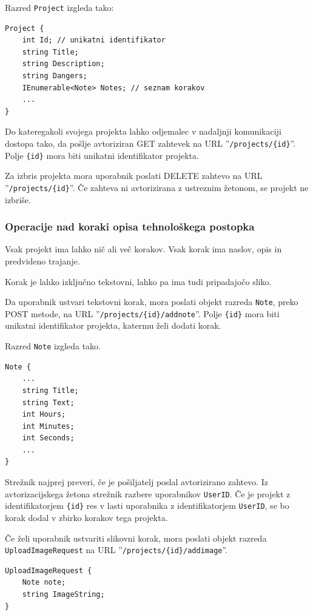 \documentclass[a4paper, 12pt]{book}
\begin{document}
\noindent Razred \texttt{Project} izgleda tako:

\begin{verbatim}
Project { 
    int Id; // unikatni identifikator 
    string Title; 
    string Description; 
    string Dangers; 
    IEnumerable<Note> Notes; // seznam korakov 
    ... 
}
\end{verbatim}
Do kateregakoli svojega projekta lahko odjemalec v nadaljnji komunikaciji dostopa tako, da pošlje avtoriziran GET zahtevek na URL ''\texttt{/projects/\{id\}}''.
Polje \texttt{\{id\}} mora biti unikatni identifikator projekta.

Za izbris projekta mora uporabnik poslati DELETE zahtevo na URL ''\texttt{/projects/\{id\}}''.
Če zahteva ni avtorizirana z ustreznim žetonom, se projekt ne izbriše.

\subsubsection{Operacije nad koraki opisa tehnološkega postopka}

Vsak projekt ima lahko nič ali več korakov.
Vsak korak ima naslov, opis in predvideno trajanje.

Korak je lahko izključno tekstovni, lahko pa ima tudi pripadajočo sliko.

Da uporabnik ustvari tekstovni korak, mora poslati objekt razreda \texttt{Note}, preko POST metode, na URL ''\texttt{/projects/\{id\}/addnote}''.
Polje \texttt{\{id\}} mora biti unikatni identifikator projekta, katermu želi dodati korak.

\noindent Razred \texttt{Note} izgleda tako.

\begin{verbatim}
Note { 
    ... 
    string Title; 
    string Text; 
    int Hours; 
    int Minutes;
    int Seconds;
    ...
}
\end{verbatim}

Strežnik najprej preveri, če je pošiljatelj poslal avtorizirano zahtevo.
Iz avtorizacijskega žetona strežnik razbere uporabnikov \texttt{UserID}. 
Če je projekt z identifikatorjem \texttt{\{id\}} res v lasti uporabnika z identifikatorjem \texttt{UserID}, se bo korak dodal v zbirko korakov tega projekta.

Če želi uporabnik ustvariti slikovni korak, mora poslati objekt razreda \texttt{UploadImageRequest} na URL ''\texttt{/projects/\{id\}/addimage}''.

\begin{verbatim}
UploadImageRequest { 
    Note note; 
    string ImageString; 
}
\end{verbatim}
\end{document}
